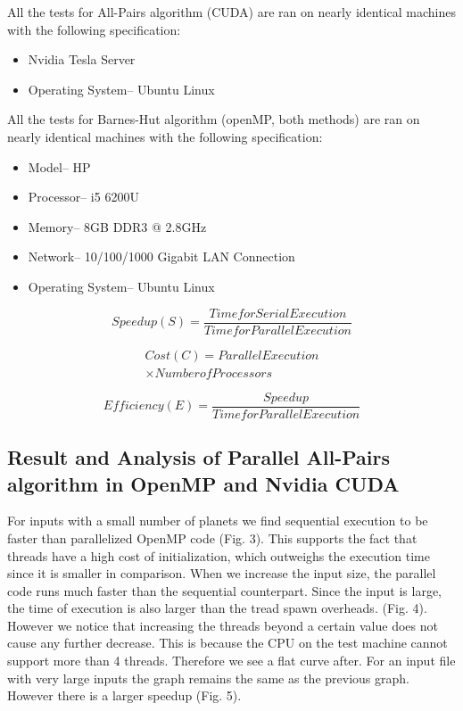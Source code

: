 \documentclass[letterpaper, 10 pt, conference]{ieeeconf}
\begin{document}
    All the tests for All-Pairs algorithm (CUDA) are ran on nearly identical machines with the following specification:
    \begin{itemize}
        \item Nvidia Tesla Server
        \item Operating System{--} Ubuntu Linux
    \end{itemize}

    All the tests for Barnes-Hut algorithm (openMP, both methods) are ran on nearly identical machines with the following specification:
    \begin{itemize}
        \item Model{--} HP
        \item Processor{--} i5 6200U
        \item Memory{--} 8GB DDR3 @ 2.8GHz
        \item Network{--} 10/100/1000 Gigabit LAN Connection
        \item Operating System{--} Ubuntu Linux
    \end{itemize}

    \begin{equation}
        \label{eq:7}
        Speedup (S) = \frac{Time for Serial Execution}{Time for Parallel Execution}
    \end{equation}

    \begin{multline}
        \label{eq:8}
        Cost (C) = Parallel Execution \\
        \times Number of Processors
    \end{multline}

    \begin{equation}
        \label{eq:9}
        Efficiency (E) = \frac{Speedup}{Time for Parallel Execution}
    \end{equation}

    \subsection{Result and Analysis of Parallel All-Pairs algorithm in OpenMP and Nvidia CUDA}



    For inputs with a small number of planets we find sequential execution to be faster than parallelized OpenMP code (Fig. 3). This supports the fact that threads have a high cost of initialization, which outweighs the execution time since it is smaller in comparison. When we increase the input size, the parallel code runs much faster than the sequential counterpart. Since the input is large, the time of execution is also larger than the tread spawn overheads. (Fig. 4). However we notice that increasing the threads beyond a certain value does not cause any further decrease. This is because the CPU on the test machine cannot support more than 4 threads. Therefore we see a flat curve after. For an input file with very large inputs the graph remains the same as the previous graph. However there is a larger speedup (Fig. 5). \par
\end{document}
